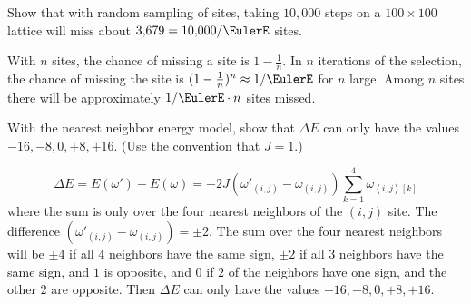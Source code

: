 \documentclass[12pt]{article}
\begin{document}
\begin{exercise}
    Show that with random sampling of sites, taking \( 10{,}000 \) steps
    on a \( 100 \times 100 \) lattice will miss about \( 3{,}679 = 10{,}000/\EulerE
    \) sites.
\end{exercise}
\begin{solution}
    With \( n \) sites, the chance of missing a site is \( 1 - \frac{1}{n}
    \).  In \( n \) iterations of the selection, the chance of missing
    the site is \( (1- \frac{1}{n})^n \approx 1/\EulerE \) for \( n \)
    large.  Among \( n \) sites there will be approximately \( 1/\EulerE
    \cdot n \) sites missed.
\end{solution}

\begin{exercise}
    With the nearest neighbor energy model, show that \( \Delta E \) can
    only have the values \( -16, -8, 0, +8, +16 \).  (Use the convention
    that \( J = 1 \).)
\end{exercise}
\begin{solution}
    \[
        \Delta E = E(\omega') - E(\omega) = -2J (\omega'_{(i,j)} -
        \omega_{(i,j)}) \sum\limits_{k=1}^4\omega_{\left\langle i,j
        \right\rangle[k]}
    \] where the sum is only over the four nearest neighbors of the \( (i,
    j) \) site.  The difference \( (\omega'_{(i,j)} - \omega_{(i,j)}) =
    \pm 2 \).  The sum over the four nearest neighbors will be \( \pm 4 \)
    if all \( 4 \) neighbors have the same sign, \( \pm 2 \) if all \( 3
    \) neighbors have the same sign, and \( 1 \) is opposite, and \( 0 \)
    if \( 2 \) of the neighbors have one sign, and the other \( 2 \) are
    opposite.  Then \( \Delta E \) can only have the values \( -16, -8,
    0, +8, +16 \).
\end{solution}
\end{document}
